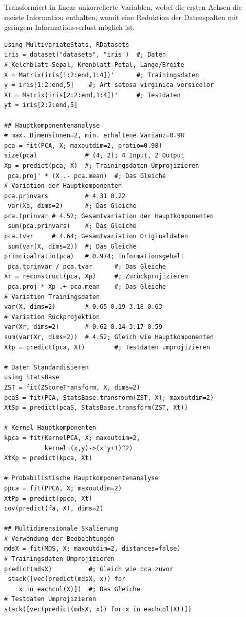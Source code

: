 \documentclass[10pt,twocolumn]{scrartcl}
\begin{document}
Transformiert in linear unkorrelierte Variablen, wobei die ersten Achsen die
meiste Information enthalten, womit eine Reduktion der Datenspalten mit geringem Informationsverlust möglich ist.

\begin{lstlisting}
using MultivariateStats, RDatasets
iris = dataset("datasets", "iris")  #; Daten
# Kelchblatt-Sepal, Kronblatt-Petal, Länge/Breite
X = Matrix(iris[1:2:end,1:4])'      #; Trainingsdaten
y = iris[1:2:end,5]    #; Art setosa virginica versicolor
Xt = Matrix(iris[2:2:end,1:4])'     #; Testdaten
yt = iris[2:2:end,5]

## Hauptkomponentenanalyse
# max. Dimensionen=2, min. erhaltene Varianz=0.98
pca = fit(PCA, X; maxoutdim=2, pratio=0.98)
size(pca)             # (4, 2); 4 Input, 2 Output
Xp = predict(pca, X)  #; Trainingsdaten Umprojizieren
 pca.proj' * (X .- pca.mean)  #; Das Gleiche
# Variation der Hauptkomponenten
pca.prinvars          # 4.31 0.22
 var(Xp, dims=2)      #; Das Gleiche
pca.tprinvar # 4.52; Gesamtvariation der Hauptkomponenten
 sum(pca.prinvars)    #; Das Gleiche
pca.tvar     # 4.64; Gesamtvariation Originaldaten
 sum(var(X, dims=2))  #; Das Gleiche
principalratio(pca)   # 0.974; Informationsgehalt
 pca.tprinvar / pca.tvar      #; Das Gleiche
Xr = reconstruct(pca, Xp)     #; Zurückprojizieren
 pca.proj * Xp .+ pca.mean    #; Das Gleiche
# Variation Trainingsdaten
var(X, dims=2)        # 0.65 0.19 3.18 0.63
# Variation Rückprojektion
var(Xr, dims=2)       # 0.62 0.14 3.17 0.59
sum(var(Xr, dims=2))  # 4.52; Gleich wie Hauptkomponenten
Xtp = predict(pca, Xt)        #; Testdaten umprojizieren

# Daten Standardisieren
using StatsBase
ZST = fit(ZScoreTransform, X, dims=2)
pcaS = fit(PCA, StatsBase.transform(ZST, X); maxoutdim=2)
XtSp = predict(pcaS, StatsBase.transform(ZST, Xt))

# Kernel Hauptkomponenten
kpca = fit(KernelPCA, X; maxoutdim=2,
           kernel=(x,y)->(x'y+1)^2)
XtKp = predict(kpca, Xt)

# Probabilistische Hauptkomponentenanalyse
ppca = fit(PPCA, X; maxoutdim=2)
XtPp = predict(ppca, Xt)
cov(predict(fa, X), dims=2)

## Multidimensionale Skalierung
# Verwendung der Beobachtungen
mdsX = fit(MDS, X; maxoutdim=2, distances=false)
# Trainingsdaten Umprojizieren
predict(mdsX)          #; Gleich wie pca zuvor
 stack([vec(predict(mdsX, x)) for
    x in eachcol(X)])  #; Das Gleiche
# Testdaten Umprojizieren
stack([vec(predict(mdsX, x)) for x in eachcol(Xt)])


\end{lstlisting}
\end{document}
